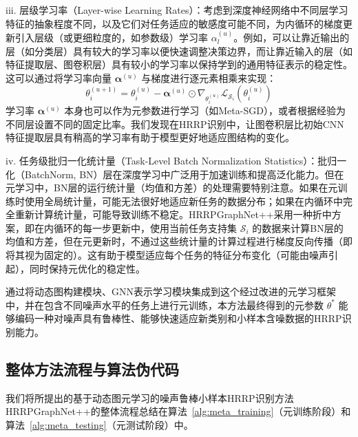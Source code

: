 iii.  层级学习率（Layer-wise Learning Rates）：考虑到深度神经网络中不同层学习特征的抽象程度不同，以及它们对任务适应的敏感度可能不同，为内循环的梯度更新引入层级（或更细粒度的，如参数级）学习率 $\alpha^{(u)}_l$。例如，可以让靠近输出的层（如分类层）具有较大的学习率以便快速调整决策边界，而让靠近输入的层（如特征提取层、图卷积层）具有较小的学习率以保持学到的通用特征表示的稳定性。这可以通过将学习率向量 $\boldsymbol{\alpha}^{(u)}$ 与梯度进行逐元素相乘来实现：
    \begin{equation}
        \theta_i^{(u+1)} = \theta_i^{(u)} - \boldsymbol{\alpha}^{(u)} \odot \nabla_{\theta_i^{(u)}} \mathcal{L}_{\mathcal{S}_i}(\theta_i^{(u)})
        \label{eq:layerwise_lr_update}
    \end{equation}
    学习率 $\boldsymbol{\alpha}^{(u)}$ 本身也可以作为元参数进行学习（如Meta-SGD），或者根据经验为不同层设置不同的固定比率。我们发现在HRRP识别中，让图卷积层比初始CNN特征提取层具有稍高的学习率有助于模型更好地适应图结构的变化。

iv.  任务级批归一化统计量（Task-Level Batch Normalization Statistics）：批归一化（BatchNorm, BN）层在深度学习中广泛用于加速训练和提高泛化能力。但在元学习中，BN层的运行统计量（均值和方差）的处理需要特别注意。如果在元训练时使用全局统计量，可能无法很好地适应新任务的数据分布；如果在内循环中完全重新计算统计量，可能导致训练不稳定。HRRPGraphNet++采用一种折中方案，即在内循环的每一步更新中，使用当前任务支持集 $\mathcal{S}_i$ 的数据来计算BN层的均值和方差，但在元更新时，不通过这些统计量的计算过程进行梯度反向传播（即将其视为固定的）。这有助于模型适应每个任务的特征分布变化（可能由噪声引起），同时保持元优化的稳定性。

通过将动态图构建模块、GNN表示学习模块集成到这个经过改进的元学习框架中，并在包含不同噪声水平的任务上进行元训练，本方法最终得到的元参数 $\theta^*$ 能够编码一种对噪声具有鲁棒性、能够快速适应新类别和小样本含噪数据的HRRP识别能力。

\subsection{整体方法流程与算法伪代码}
\label{subsec:algorithm}

我们将所提出的基于动态图元学习的噪声鲁棒小样本HRRP识别方法HRRPGraphNet++的整体流程总结在算法~\ref{alg:meta_training}（元训练阶段）和算法~\ref{alg:meta_testing}（元测试阶段）中。

